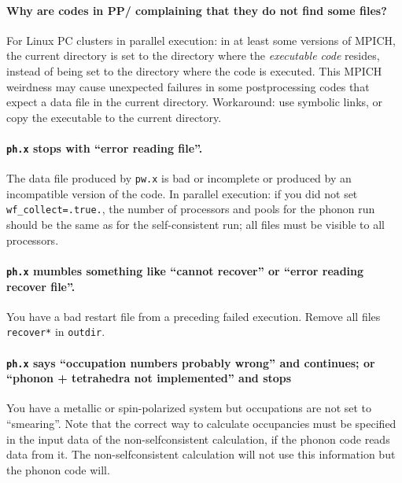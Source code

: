 \documentclass[12pt,a4paper]{article}
\begin{document}
\paragraph{Why are codes in PP/ complaining that they do not
find some files?}

For Linux PC clusters in parallel execution: in at least some 
versions of MPICH, the current directory is set to the directory where
the \emph{executable code} resides, instead of being set to the
directory where the code is executed.
This MPICH weirdness may cause unexpected failures in some
postprocessing codes that expect a data file in the current directory.
Workaround: use symbolic links, or copy the executable to the current
directory.

\paragraph{\texttt{ph.x} stops with ``error reading file''.}

The data file produced by \texttt{pw.x} is bad or incomplete or
produced by an incompatible version of the code.
In parallel execution: if you did not set \texttt{wf\_collect=.true.},
the number of processors and pools for the phonon run should be the 
same as for the self-consistent run; all files must be visible to all 
processors.

\paragraph{\texttt{ph.x} mumbles something like ``cannot recover'' or
           ``error reading recover file''.}

You have a bad restart file from a preceding failed execution.
Remove all files \texttt{recover*} in \texttt{outdir}.

\paragraph{\texttt{ph.x} says ``occupation numbers probably wrong''
and continues; or ``phonon + tetrahedra not implemented'' and stops}

You have a metallic or spin-polarized system but occupations are not 
set to ``smearing''. Note that the correct way to calculate occupancies 
must be specified in the input data of the non-selfconsistent 
calculation, if the phonon code reads data from it. The non-selfconsistent 
calculation will not use this information but the phonon code will.
\end{document}
